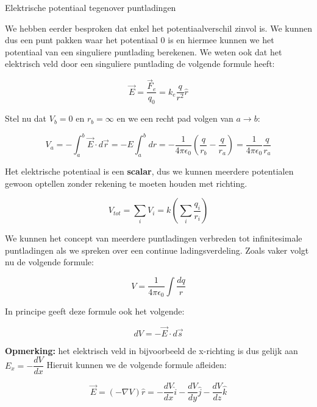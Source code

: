 \begin{app}{Elektrische potentiaal tegenover puntladingen}

    We hebben eerder besproken dat enkel het potentiaalverschil zinvol is. We kunnen dus een punt pakken waar het potentiaal 0 is en hiermee kunnen we het potentiaal van een singuliere puntlading berekenen. We weten ook dat het elektrisch veld door een singuliere puntlading de volgende formule heeft:
    
    \begin{equation*}
        \Vec{E} = \frac{\Vec{F}_e}{q_0}= k_e\frac{q}{r^2}\hat{r}
    \end{equation*}
    
    
    \noindent Stel nu dat $ V_b = 0 $ en $ r_b = \infty $ en we een recht pad volgen van $ a \to b $:
    
    \begin{equation*}
        V_a = - \int_a^b \Vec{E} \cdot d\Vec{r} = - E \int_a^{b} dr = - \frac{1}{4\pi\epsilon_0}\left(\frac{q}{r_b} - \frac{q}{r_a}\right)  = \frac{1}{4\pi\epsilon_0}\dfrac{q}{r_a}
    \end{equation*}
    
    \noindent Het elektrische potentiaal is een \textbf{scalar}, dus we kunnen meerdere potentialen gewoon optellen zonder rekening te moeten houden met richting.
    
    \begin{equation*}
        V_{tot} = \sum_i V_{i} = k\left(\sum_i \dfrac{q_i}{r_{i}}\right)
    \end{equation*}
    
    \noindent We kunnen het concept van meerdere puntladingen verbreden tot infinitesimale puntladingen als we spreken over een continue ladingsverdeling. Zoals vaker volgt nu de volgende formule:
    
    \begin{equation*}
        V = \dfrac{1}{4\pi\epsilon_0}\int\dfrac{dq}{r}
    \end{equation*}
    
    \noindent In principe geeft deze formule ook het volgende:
    
    \begin{equation*}
        dV = -\Vec{E} \cdot d\Vec{s}
    \end{equation*}
    
    \noindent \textbf{Opmerking:} het elektrisch veld in bijvoorbeeld de x-richting is dus gelijk aan $ E_x = -\dfrac{dV}{dx} $ Hieruit kunnen we de volgende formule afleiden:
    
    \begin{equation*}
        \Vec{E} = \left(-\nabla V\right)\hat{r} = -\dfrac{dV}{dx}\hat{i} -\dfrac{dV}{dy}\hat{j} -\dfrac{dV}{dz}\hat{k}
    \end{equation*}

\end{app}

